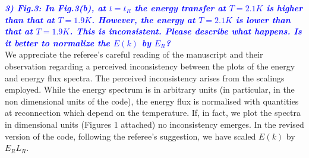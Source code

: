 \documentclass[a4paper,10pt]{article}
\def\blue#1{\textcolor{blue}{#1}}
\def\refcomment#1{\textbf{\blue{\emph{#1}}}\\}
\begin{document}
    \refcomment{3) Fig.3: In Fig.3(b), at $t = t_R$ the energy transfer at $T = 2.1K$ is
    higher than that at $T = 1.9K$. However, the energy at $T = 2.1K$ is lower
    than that at $T = 1.9K$. This is inconsistent. Please describe what
    happens. Is it better to normalize the $E(k)$ by $E_R$?}

    We appreciate the referee’s careful reading of the manuscript and their observation regarding a perceived inconsistency between the plots of the energy and energy flux spectra. The perceived inconsistency arises from the scalings employed. While the energy spectrum is in arbitrary units (in particular, in the non dimensional units of the code), the energy flux is normalised with quantities at reconnection which depend on the temperature. If, in fact, we plot the spectra in dimensional units (Figures 1 attached) no inconsistency emerges. In the revised version of the code, following the referee's suggestion, we have scaled $E(k)$ by $E_R L_R$.
    
\end{document}
